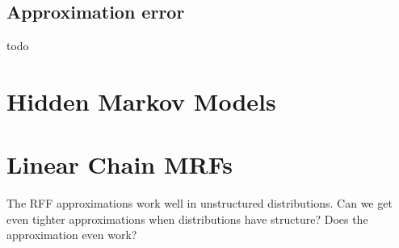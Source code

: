 \documentclass{article}
\begin{document}
\subsection{Approximation error}
todo

\section{Hidden Markov Models}


\section{Linear Chain MRFs}
The RFF approximations work well in unstructured distributions.
Can we get even tighter approximations when distributions have structure?
Does the approximation even work?
\end{document}
